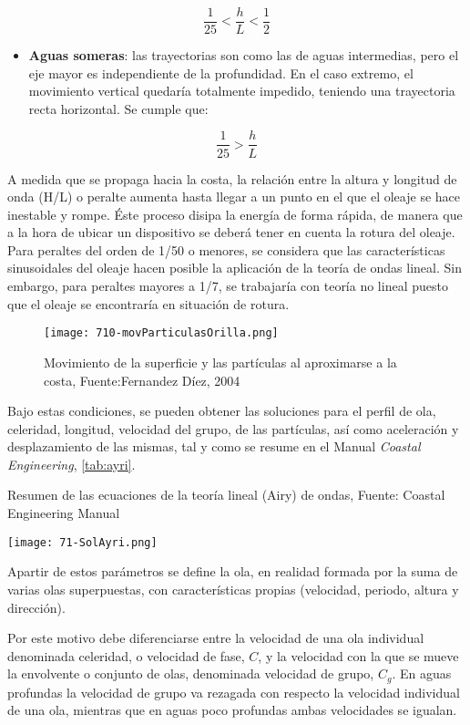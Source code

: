 \[\frac{1}{25}<\frac{h}{L}<\frac{1}{2}\]

\begin{itemize}
\item
  \textbf{Aguas someras}: las trayectorias son como las de aguas
  intermedias, pero el eje mayor es independiente de la profundidad. En
  el caso extremo, el movimiento vertical quedaría totalmente impedido,
  teniendo una trayectoria recta horizontal. Se cumple que:
\end{itemize}

\[\frac{1}{25}>\frac{h}{L}\]

A medida que se propaga hacia la costa, la relación entre la altura y
longitud de onda (H/L) o peralte aumenta hasta llegar a un punto en el
que el oleaje se hace inestable y rompe. Éste proceso disipa la energía
de forma rápida, de manera que a la hora de ubicar un dispositivo se
deberá tener en cuenta la rotura del oleaje. Para peraltes del orden de
1/50 o menores, se considera que las características sinusoidales del
oleaje hacen posible la aplicación de la teoría de ondas lineal. Sin
embargo, para peraltes mayores a 1/7, se trabajaría con teoría no lineal
puesto que el oleaje se encontraría en situación de rotura.

\begin{figure}
\centering
\texttt{[image: 710-movParticulasOrilla.png]}
\caption[Movimiento de las partículas]{Movimiento de la superficie y las partículas al aproximarse a la costa, Fuente:Fernandez Díez, 2004}
\end{figure}

Bajo estas condiciones, se pueden obtener las soluciones para el perfil
de ola, celeridad, longitud, velocidad del grupo, de las partículas, así
como aceleración y desplazamiento de las mismas, tal y como se resume en
el Manual \emph{Coastal Engineering}, \autoref{tab:ayri}.

\begin{table}
\centering
\caption[Teoría Airy]{Resumen de las ecuaciones de la teoría lineal (Airy) de ondas, Fuente: Coastal Engineering Manual}
\texttt{[image: 71-SolAyri.png]}
\end{table}

Apartir de estos parámetros se define la ola, en realidad formada por la
suma de varias olas superpuestas, con características propias
(velocidad, periodo, altura y dirección).

Por este motivo debe diferenciarse entre la velocidad de una ola
individual denominada celeridad, o velocidad de fase, \(C\), y la
velocidad con la que se mueve la envolvente o conjunto de olas,
denominada velocidad de grupo, \(C_ g\). En aguas profundas la velocidad
de grupo va rezagada con respecto la velocidad individual de una ola,
mientras que en aguas poco profundas ambas velocidades se igualan.

